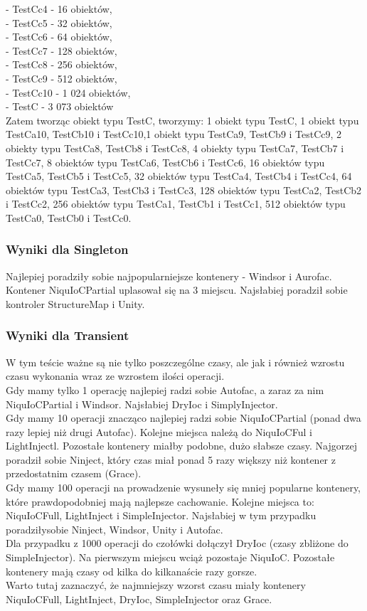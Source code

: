 \documentclass[12pt]{article}
\begin{document}
- TestCc4 - 16 obiektów,\\
- TestCc5 - 32 obiektów,\\
- TestCc6 - 64 obiektów,\\
- TestCc7 - 128 obiektów,\\
- TestCc8 - 256 obiektów,\\
- TestCc9 - 512 obiektów,\\
- TestCc10 - 1 024 obiektów,\\
- TestC - 3 073 obiektów\\
Zatem tworząc obiekt typu TestC, tworzymy: 1 obiekt typu TestC, 1 obiekt typu TestCa10, TestCb10 i TestCc10,1 obiekt typu TestCa9, TestCb9 i TestCc9, 2 obiekty typu TestCa8, TestCb8 i TestCc8, 4 obiekty typu TestCa7, TestCb7 i TestCc7, 8 obiektów typu TestCa6, TestCb6 i TestCc6, 16 obiektów typu TestCa5, TestCb5 i TestCc5, 32 obiektów typu TestCa4, TestCb4 i TestCc4, 64 obiektów typu TestCa3, TestCb3 i TestCc3, 128 obiektów typu TestCa2, TestCb2 i TestCc2, 256 obiektów typu TestCa1, TestCb1 i TestCc1, 512 obiektów typu TestCa0, TestCb0 i TestCc0.

\subsubsection{Wyniki dla Singleton}
Najlepiej poradziły sobie najpopularniejsze kontenery - Windsor i Aurofac. Kontener NiquIoCPartial uplasował się na 3 miejscu. Najsłabiej poradził sobie kontroler StructureMap i Unity.

\subsubsection{Wyniki dla Transient}
W tym teście ważne są nie tylko poszczególne czasy, ale jak i również wzrostu czasu wykonania wraz ze wzrostem ilości operacji.\\
Gdy mamy tylko 1 operację najlepiej radzi sobie Autofac, a zaraz za nim NiquIoCPartial i Windsor. Najsłabiej DryIoc i SimplyInjector.\\
Gdy mamy 10 operacji znacząco najlepiej radzi sobie NiquIoCPartial (ponad dwa razy lepiej niż drugi Autofac). Kolejne miejsca należą do NiquIoCFul i LightInjectl. Pozostałe kontenery miałby podobne, dużo słabsze czasy. Najgorzej poradził sobie Ninject, który czas miał ponad 5 razy większy niż kontener z przedostatnim czasem (Grace).\\
Gdy mamy 100 operacji na prowadzenie wysuneły się mniej popularne kontenery, które prawdopodobniej mają najlepsze cachowanie. Kolejne miejsca to: NiquIoCFull, LightInject i SimpleInjector. Najsłabiej w tym przypadku poradziłysobie Ninject, Windsor, Unity i Autofac.\\
Dla przypadku z 1000 operacji do czołówki dołączył DryIoc (czasy zbliżone do SimpleInjector). Na pierwszym miejscu wciąż pozostaje NiquIoC. Pozostałe kontenery mają czasy od kilka do kilkanaście razy gorsze.\\
Warto tutaj zaznaczyć, że najmniejszy wzorst czasu miały kontenery NiquIoCFull, LightInject, DryIoc, SimpleInjector oraz Grace.
\end{document}
